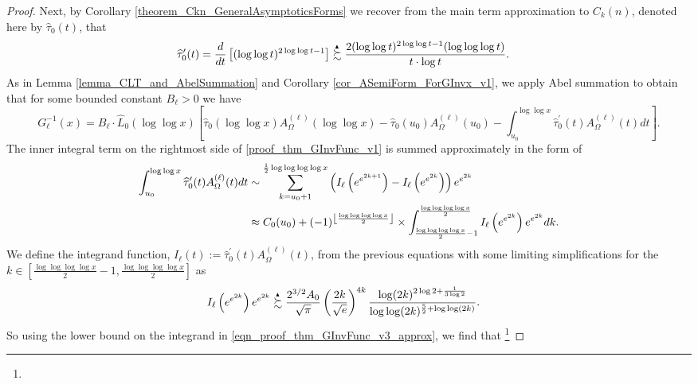 \documentclass[11pt,reqno,a4letter]{article}
\numberwithin{figure}{section}
\numberwithin{table}{section}
\newcommand{\Floor}[2]{\ensuremath{\left\lfloor \frac{#1}{#2} \right\rfloor}}
\theoremstyle{plain}
\numberwithin{theorem}{section}
\theoremstyle{definition}
\newcommand{\SuccSim}[0]{\overset{_{\scriptsize{\blacktriangle}}}{\succsim}}
\begin{document}
\begin{proof}
Next, by Corollary \ref{theorem_Ckn_GeneralAsymptoticsForms} 
we recover from the main term approximation to $C_k(n)$, denoted here by 
$\widehat{\tau}_0(t)$, that 
\begin{align*} 
\widehat{\tau}_0^{\prime}(t) & = \frac{d}{dt}\left[ 
     (\log\log t)^{2\log\log t-1} 
     \right] \SuccSim 
     \frac{2 (\log\log t)^{2\log\log t-1} (\log\log\log t)}{t \cdot \log t}. 
\end{align*} 
As in Lemma \ref{lemma_CLT_and_AbelSummation} and Corollary \ref{cor_ASemiForm_ForGInvx_v1}, 
we apply Abel summation to obtain that for some bounded constant $B_{\ell} > 0$ we have 
\begin{equation} 
\label{proof_thm_GInvFunc_v1} 
G_{\ell}^{-1}(x) = B_{\ell} \cdot \widehat{L}_0(\log\log x) \left[
     \widehat{\tau}_0(\log\log x) A_{\Omega}^{(\ell)}(\log\log x) - 
     \widehat{\tau}_0(u_0) A_{\Omega}^{(\ell)}(u_0) - \int_{u_0}^{\log\log x} 
     \widehat{\tau}_0^{\prime}(t) A_{\Omega}^{(\ell)}(t) dt\right]. 
\end{equation} 
The inner integral term on the rightmost side of \eqref{proof_thm_GInvFunc_v1} 
is summed approximately in the form of 
\begin{align} 
\label{eqn_proof_thm_GInvFunc_v3_approx} 
\int_{u_0}^{\log\log x} \widehat{\tau}_0^{\prime}(t) A_{\Omega}^{(\ell)}(t) dt & \sim 
     \sum_{k=u_0+1}^{\frac{1}{2}\log\log\log\log x} \left( 
     I_{\ell}\left(e^{e^{2k+1}}\right) - 
     I_{\ell}\left(e^{e^{2k}}\right) 
     \right) e^{e^{2k}} \\ 
\notag 
     & \approx 
     C_0(u_0) + 
     (-1)^{\Floor{\log\log\log\log x}{2}} \times 
     \int_{\frac{\log\log\log\log x}{2}-1}^{\frac{\log\log\log\log x}{2}} 
     I_{\ell}\left(e^{e^{2k}}\right) 
     e^{e^{2k}} dk. 
\end{align} 
We define the integrand function, 
$I_{\ell}(t) := \widehat{\tau}_0^{\prime}(t) A_{\Omega}^{(\ell)}(t)$, 
from the previous equations with some limiting simplifications for the 
$k \in \left[\frac{\log\log\log\log x}{2}-1, \frac{\log\log\log\log x}{2}\right]$ as 
\begin{align} 
\label{eqn_proof_thm_GInvFunc_v3_approx} 
I_{\ell}\left(e^{e^{2k}}\right) e^{e^{2k}}& \SuccSim 
     \frac{2^{3/2} A_0}{\sqrt{\pi}} \left(\frac{2k}{\sqrt{e}}\right)^{4k} 
     \frac{\log(2k)^{2\log 2 + \frac{1}{3\log 2}}}{\log\log(2k)^{\frac{5}{2} + \log\log(2k)}}. 
\end{align} 
So using the lower bound on the integrand in \eqref{eqn_proof_thm_GInvFunc_v3_approx}, 
we find that \footnote{ 
}
\end{proof}
\end{document}

